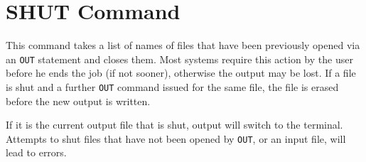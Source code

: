 \section{SHUT Command}
\hypertarget{command:SHUT}{}
This command takes a list of names of files that have been previously
opened via an \texttt{OUT} statement and closes them. Most systems require this
action by the user before he ends the {\REDUCE} job (if not sooner),
otherwise the output may be lost. If a file is shut and a further \texttt{OUT}
command issued for the same file, the file is erased before the new output
is written.

If it is the current output file that is shut, output will switch to the
terminal.  Attempts to shut files that have not been opened by \texttt{OUT},
or an input file, will lead to errors.

